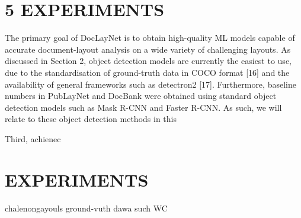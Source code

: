 \documentclass[11pt,a4paper]{article}
\begin{document}
\section{5 EXPERIMENTS}

The primary goal of DocLayNet is to obtain high-quality ML models capable of accurate document-layout analysis on a wide variety of challenging layouts. As discussed in Section 2, object detection models are currently the easiest to use, due to the standardisation of ground-truth data in COCO format [16] and the availability of general frameworks such as detectron2 [17]. Furthermore, baseline numbers in PubLayNet and DocBank were obtained using standard object detection models such as Mask R-CNN and Faster R-CNN. As such, we will relate to these object detection methods in this

\begin{figure}[h]
\end{figure}

Third, achienec

\section{EXPERIMENTS}

chalenongayouls ground-vuth dawa such WC

\begin{figure}[h]
% 
% 
% 
\end{figure}
\end{document}
